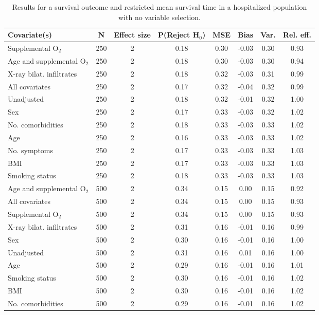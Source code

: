 \documentclass{article}
\begin{document}
\begin{table}
\caption{Results for a survival outcome and restricted mean survival time in a hospitalized population with no variable selection.}
\hspace*{-1.5cm}\begin{tabular}{lccccccc} \toprule
Covariate(s) & N & Effect size & P(Reject H$_0$) & MSE & Bias & Var. & Rel. eff.\\ \midrule
Supplemental O$_{2}$ & 250 & 2 & 0.18 & 0.30 & -0.03 & 0.30 & 0.93\\
Age and supplemental O$_{2}$ & 250 & 2 & 0.18 & 0.30 & -0.03 & 0.30 & 0.94\\
X-ray bilat. infiltrates & 250 & 2 & 0.18 & 0.32 & -0.03 & 0.31 & 0.99\\
All covariates & 250 & 2 & 0.17 & 0.32 & -0.04 & 0.32 & 0.99\\
Unadjusted & 250 & 2 & 0.18 & 0.32 & -0.01 & 0.32 & 1.00\\
Sex & 250 & 2 & 0.17 & 0.33 & -0.03 & 0.32 & 1.02\\
No. comorbidities & 250 & 2 & 0.18 & 0.33 & -0.03 & 0.33 & 1.02\\
Age & 250 & 2 & 0.16 & 0.33 & -0.03 & 0.33 & 1.02\\
No. symptoms & 250 & 2 & 0.17 & 0.33 & -0.03 & 0.33 & 1.03\\
BMI & 250 & 2 & 0.17 & 0.33 & -0.03 & 0.33 & 1.03\\
Smoking status & 250 & 2 & 0.18 & 0.33 & -0.03 & 0.33 & 1.03\\ \midrule
Age and supplemental O$_{2}$ & 500 & 2 & 0.34 & 0.15 & 0.00 & 0.15 & 0.92\\
All covariates & 500 & 2 & 0.34 & 0.15 & 0.00 & 0.15 & 0.93\\
Supplemental O$_{2}$ & 500 & 2 & 0.34 & 0.15 & 0.00 & 0.15 & 0.93\\
X-ray bilat. infiltrates & 500 & 2 & 0.31 & 0.16 & -0.01 & 0.16 & 0.99\\
Sex & 500 & 2 & 0.30 & 0.16 & -0.01 & 0.16 & 1.00\\
Unadjusted & 500 & 2 & 0.31 & 0.16 & 0.01 & 0.16 & 1.00\\
Age & 500 & 2 & 0.29 & 0.16 & -0.01 & 0.16 & 1.01\\
Smoking status & 500 & 2 & 0.30 & 0.16 & -0.01 & 0.16 & 1.02\\
BMI & 500 & 2 & 0.30 & 0.16 & -0.01 & 0.16 & 1.02\\
No. comorbidities & 500 & 2 & 0.29 & 0.16 & -0.01 & 0.16 & 1.02\\ 

\end{tabular}
\end{table}
\end{document}

